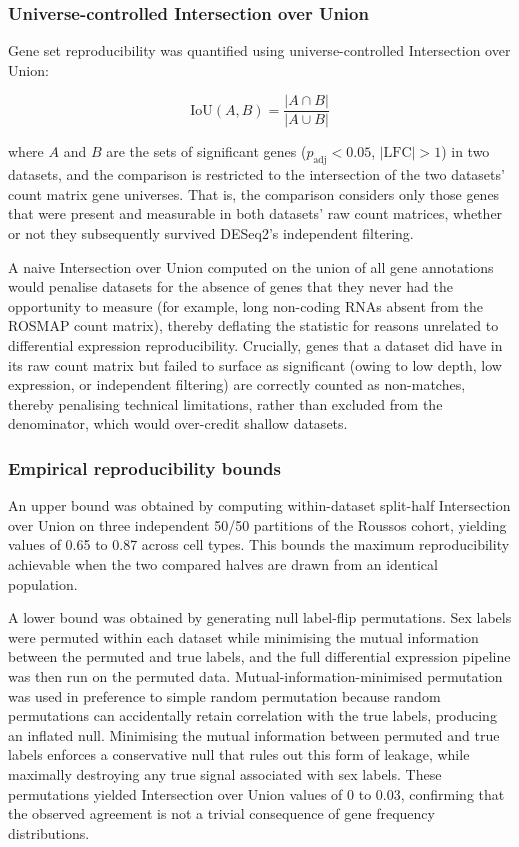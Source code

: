 \documentclass[
]{article}
\begin{document}
\subsubsection{Universe-controlled Intersection over
Union}\label{universe-controlled-intersection-over-union}

Gene set reproducibility was quantified using universe-controlled
Intersection over Union:

\[\text{IoU}(A,B) = \frac{|A \cap B|}{|A \cup B|}\]

where \(A\) and \(B\) are the sets of significant genes
(\(p_{\text{adj}} < 0.05\), \(|\text{LFC}| > 1\)) in two datasets, and
the comparison is restricted to the intersection of the two datasets'
count matrix gene universes. That is, the comparison considers only
those genes that were present and measurable in both datasets' raw count
matrices, whether or not they subsequently survived DESeq2's independent
filtering.

A naive Intersection over Union computed on the union of all gene
annotations would penalise datasets for the absence of genes that they
never had the opportunity to measure (for example, long non-coding RNAs
absent from the ROSMAP count matrix), thereby deflating the statistic
for reasons unrelated to differential expression reproducibility.
Crucially, genes that a dataset did have in its raw count matrix but
failed to surface as significant (owing to low depth, low expression, or
independent filtering) are correctly counted as non-matches, thereby
penalising technical limitations, rather than excluded from the
denominator, which would over-credit shallow datasets.

\subsubsection{Empirical reproducibility
bounds}\label{empirical-reproducibility-bounds}

An upper bound was obtained by computing within-dataset split-half
Intersection over Union on three independent 50/50 partitions of the
Roussos cohort, yielding values of 0.65 to 0.87 across cell types. This
bounds the maximum reproducibility achievable when the two compared
halves are drawn from an identical population.

A lower bound was obtained by generating null label-flip permutations.
Sex labels were permuted within each dataset while minimising the mutual
information between the permuted and true labels, and the full
differential expression pipeline was then run on the permuted data.
Mutual-information-minimised permutation was used in preference to
simple random permutation because random permutations can accidentally
retain correlation with the true labels, producing an inflated null.
Minimising the mutual information between permuted and true labels
enforces a conservative null that rules out this form of leakage, while
maximally destroying any true signal associated with sex labels. These
permutations yielded Intersection over Union values of 0 to 0.03,
confirming that the observed agreement is not a trivial consequence of
gene frequency distributions.
\end{document}
